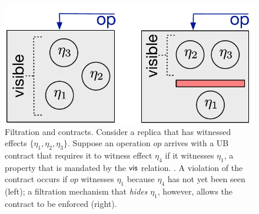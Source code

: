
\begin{figure}
  \centering
  \includegraphics[scale=0.36]{Figures/ub.pdf}
  \caption{\small Filtration and \UB{} contracts.  Consider a replica that
    has witnessed effects $\{\eta_1,\eta_2,\eta_3\}$.  Suppose an
    operation $op$ arrives with a \textsf{UB} contract that requires
    it to witness effect $\eta_4$ if it witnesses $\eta_1$, a property
    that is mandated by the ${\normalfont \textsf{vis}}$ relation.  . A violation of the
    contract occurs if $op$ witnesses $\eta_1$ because $\eta_4$ has
    not yet been seen (left); a filtration mechanism that \emph{hides}
    $\eta_1$, however, allows the contract to be enforced (right).}
  \label{fig:ub}
\end{figure}  
  

